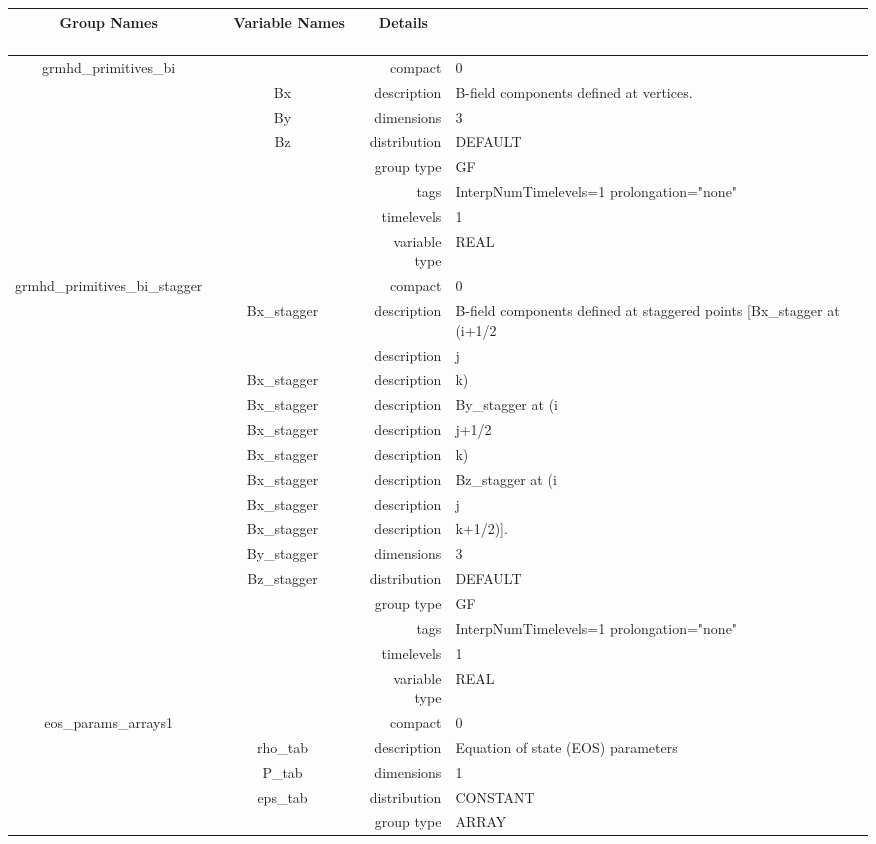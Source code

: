 \begin{tabular*}{150mm}{|c|c@{\extracolsep{\fill}}|rl|} \hline 
~ {\bf Group Names} ~ & ~ {\bf Variable Names} ~  &{\bf Details} ~ & ~ \\ 
\hline 
grmhd\_primitives\_bi &  & compact & 0 \\ 
 & Bx & description & B-field components defined at vertices. \\ 
 & By & dimensions & 3 \\ 
 & Bz & distribution & DEFAULT \\ 
 &  & group type & GF \\ 
 &  & tags & InterpNumTimelevels=1 prolongation="none" \\ 
 &  & timelevels & 1 \\ 
 &  & variable type & REAL \\ 
\hline 
grmhd\_primitives\_bi\_stagger &  & compact & 0 \\ 
 & Bx\_stagger & description & B-field components defined at staggered points [Bx\_stagger at (i+1/2 \\ 
& ~ & description & j \\ 
 & Bx\_stagger & description & k) \\ 
 & Bx\_stagger & description & By\_stagger at (i \\ 
 & Bx\_stagger & description & j+1/2 \\ 
 & Bx\_stagger & description & k) \\ 
 & Bx\_stagger & description & Bz\_stagger at (i \\ 
 & Bx\_stagger & description & j \\ 
 & Bx\_stagger & description & k+1/2)]. \\ 
 & By\_stagger & dimensions & 3 \\ 
 & Bz\_stagger & distribution & DEFAULT \\ 
 &  & group type & GF \\ 
 &  & tags & InterpNumTimelevels=1 prolongation="none" \\ 
 &  & timelevels & 1 \\ 
 &  & variable type & REAL \\ 
\hline 
eos\_params\_arrays1 &  & compact & 0 \\ 
 & rho\_tab & description & Equation of state (EOS) parameters \\ 
 & P\_tab & dimensions & 1 \\ 
 & eps\_tab & distribution & CONSTANT \\ 
 &  & group type & ARRAY \\ 

\end{tabular*}
